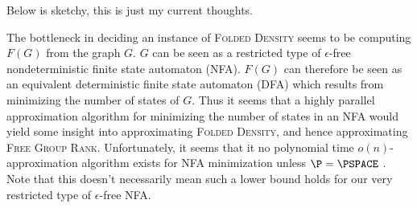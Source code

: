 \documentclass{article}
\newcommand{\FGR}{\textsc{Free Group Rank}}
\newcommand{\FD}{\textsc{Folded Density}}
\begin{document}
\begin{todo}
  Below is sketchy, this is just my current thoughts.

  The bottleneck in deciding an instance of \FD{} seems to be computing $F(G)$ from the graph $G$.
  $G$ can be seen as a restricted type of $\epsilon$-free nondeterministic finite state automaton (NFA).
  $F(G)$ can therefore be seen as an equivalent deterministic finite state automaton (DFA) which results from minimizing the number of states of $G$.
  Thus it seems that a highly parallel approximation algorithm for minimizing the number of states in an NFA would yield some insight into approximating \FD, and hence approximating \FGR.
  Unfortunately, it seems that it no polynomial time $o(n)$-approximation algorithm exists for NFA minimization unless $\P = \PSPACE$ \cite[Theorem~4]{gs05}.
  Note that this doesn't necessarily mean such a lower bound holds for our very restricted type of $\epsilon$-free NFA.
\end{todo}
\end{document}
